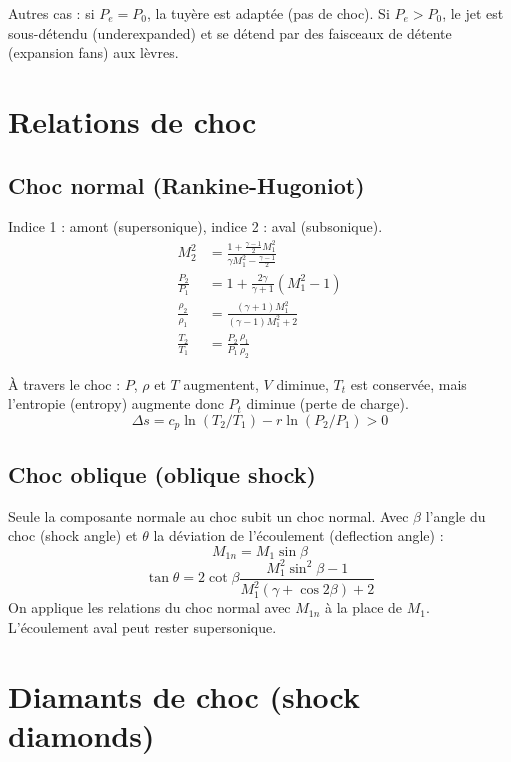 \documentclass{article}
\begin{document}
Autres cas : si $P_e = P_0$, la tuyère est adaptée (pas de choc). Si $P_e > P_0$, le jet est sous-détendu (underexpanded) et se détend par des faisceaux de détente (expansion fans) aux lèvres.

\section{Relations de choc}

\subsection{Choc normal (Rankine-Hugoniot)}
Indice 1 : amont (supersonique), indice 2 : aval (subsonique).
\begin{align}
M_2^2 &= \frac{1 + \frac{\gamma - 1}{2} M_1^2}{\gamma M_1^2 - \frac{\gamma - 1}{2}} \\
\frac{P_2}{P_1} &= 1 + \frac{2\gamma}{\gamma + 1} (M_1^2 - 1) \\
\frac{\rho_2}{\rho_1} &= \frac{(\gamma + 1) M_1^2}{(\gamma - 1) M_1^2 + 2} \\
\frac{T_2}{T_1} &= \frac{P_2}{P_1} \frac{\rho_1}{\rho_2}
\end{align}

À travers le choc : $P$, $\rho$ et $T$ augmentent, $V$ diminue, $T_t$ est conservée, mais l'entropie (entropy) augmente donc $P_t$ diminue (perte de charge).
\[ \Delta s = c_p \ln(T_2/T_1) - r \ln(P_2/P_1) > 0 \]

\subsection{Choc oblique (oblique shock)}
Seule la composante normale au choc subit un choc normal. Avec $\beta$ l'angle du choc (shock angle) et $\theta$ la déviation de l'écoulement (deflection angle) :
\[ M_{1n} = M_1 \sin\beta \]
\[ \tan\theta = 2 \cot\beta \frac{M_1^2 \sin^2\beta - 1}{M_1^2 (\gamma + \cos 2\beta) + 2} \]
On applique les relations du choc normal avec $M_{1n}$ à la place de $M_1$. L'écoulement aval peut rester supersonique.

\section{Diamants de choc (shock diamonds)}
\end{document}
